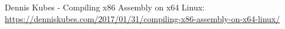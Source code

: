 \newpage
\begin{thebibliography}{9}
    Dennis Kubes - Compiling x86 Assembly on x64 Linux: \\
    \url{https://denniskubes.com/2017/01/31/compiling-x86-assembly-on-x64-linux/}
\end{thebibliography}